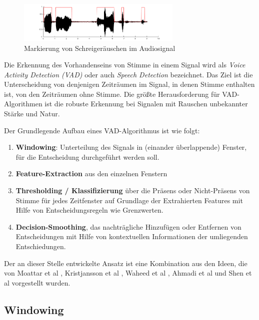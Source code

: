 \begin{figure}
	\centering
	\includegraphics[width=0.7\textwidth]{bilder/vad_introduction01.png}
	\caption{Markierung von Schreigeräuschen im Audiosignal}
	\label{img:vad01}
\end{figure}

Die Erkennung des Vorhandenseins von Stimme in einem Signal wird als \emph{Voice Activity Detection (VAD)} oder auch \emph{Speech Detection} bezeichnet. Das Ziel ist die Unterscheidung von denjenigen Zeiträumen im Signal, in denen Stimme enthalten ist, von den Zeiträumen ohne Stimme. Die größte Herausforderung für VAD-Algorithmen ist die robuste Erkennung bei Signalen mit Rauschen unbekannter Stärke und Natur. \cite[S. 1]{vad_kola} \cite[S. 1]{vad_Lisboa}

Der Grundlegende Aufbau eines VAD-Algorithmus ist wie folgt:
\begin{enumerate}
	\item \textbf{Windowing}: Unterteilung des Signals in (einander überlappende) Fenster, für die Entscheidung durchgeführt werden soll.
	\item \textbf{Feature-Extraction} aus den einzelnen Fenstern
	\item \textbf{Thresholding / Klassifizierung} über die Präsens oder Nicht-Präsens von Stimme für jedes Zeitfenster auf Grundlage der Extrahierten Features mit Hilfe von Entscheidungsregeln wie Grenzwerten.
	\item \textbf{Decision-Smoothing}, das nachträgliche Hinzufügen oder Entfernen von Entscheidungen mit Hilfe von kontextuellen Informationen der umliegenden Entschiedungen.\cite[S. 8 - 9]{vad_granada} \cite[S. 1 - 2]{vad_kola}
\end{enumerate}

Der an dieser Stelle entwickelte Ansatz ist eine Kombination aus den Ideen, die von  Moattar et al \cite{vad_Easy}, Kristjansson et al \cite{vad_Lisboa}, Waheed et al \cite{vad_entropy}, Ahmadi et al \cite{vad_ceps} und Shen et al\cite{vad_entropie02} vorgestellt wurden. 

\subsection{Windowing}
\label{sec:windowing}

